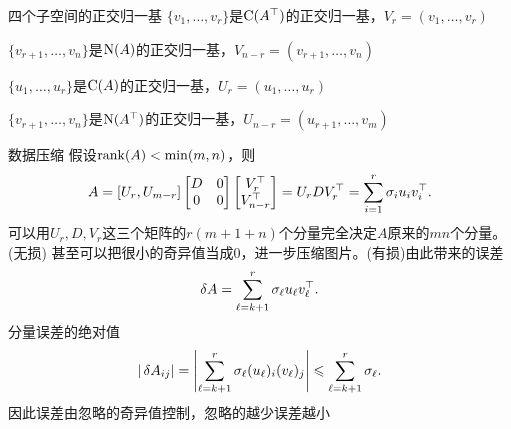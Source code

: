 \begin{example}{四个子空间的正交归一基}{}
	$\{v_1,\ldots,v_r\}$是$\operatorname{C}(A^\top)$的正交归一基，$V_r=(v_1,\ldots,v_r)$

	$\{v_{r+1},\ldots,v_n\}$是$\operatorname{N}(A)$的正交归一基，$V_{n-r}=(v_{r+1},\ldots,v_n)$

	$\{u_1,\ldots,u_r\}$是$\operatorname{C}(A)$的正交归一基，$U_r=(u_1,\ldots,u_r)$

	$\{v_{r+1},\ldots,v_n\}$是$\operatorname{N}(A^\top)$的正交归一基，$U_{n-r}=(u_{r+1},\ldots,v_m)$
\end{example}
\begin{example}{数据压缩}{}
	假设$\operatorname{rank}(A)<\min(m,n)$，则 
	\[
		A=[U_r,U_{m-r}]\begin{bmatrix}
			D&0\\0&0
		\end{bmatrix}\begin{bmatrix}
			V_r^\top\\V_{n-r}^\top
		\end{bmatrix}=U_rDV_r^\top=\sum_{i=1}^r\sigma_iu_iv_i^\top.
	\]
	可以用$U_r,D,V_r$这三个矩阵的$r(m+1+n)$个分量完全决定$A$原来的$mn$个分量。(无损)
	\tcblower
	甚至可以把很小的奇异值当成0，进一步压缩图片。(有损)由此带来的误差
	\[
		\mathop{}\!\delta A=\sum_{\ell=k+1}^r\sigma_\ell u_\ell v_\ell^\top.
	\]
	分量误差的绝对值
	\[
		|\mathop{}\!\delta A_{ij}|=\left\lvert\sum_{\ell=k+1}^r\sigma_\ell (u_\ell)_i (v_\ell)_j\right\rvert\leqslant\sum_{\ell=k+1}^r\sigma_\ell.
	\]
	因此误差由忽略的奇异值控制，忽略的越少误差越小
\end{example}
